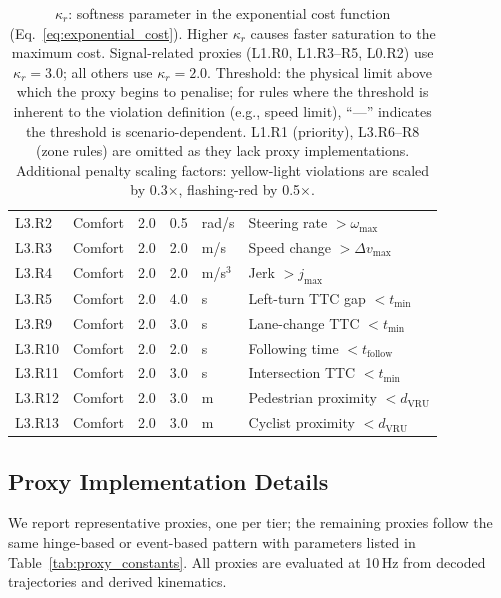 \begin{table}[t]
{\begin{tabular}{llccll}
L3.R2 & Comfort & 2.0 & 0.5 & rad/s & Steering rate $> \omega_{\max}$ \\
L3.R3 & Comfort & 2.0 & 2.0 & m/s & Speed change $> \Delta v_{\max}$ \\
L3.R4 & Comfort & 2.0 & 2.0 & m/s$^3$ & Jerk $> j_{\max}$ \\
L3.R5 & Comfort & 2.0 & 4.0 & s & Left-turn TTC gap $< t_{\min}$ \\
L3.R9 & Comfort & 2.0 & 3.0 & s & Lane-change TTC $< t_{\min}$ \\
L3.R10 & Comfort & 2.0 & 2.0 & s & Following time $< t_{\text{follow}}$ \\
L3.R11 & Comfort & 2.0 & 3.0 & s & Intersection TTC $< t_{\min}$ \\
L3.R12 & Comfort & 2.0 & 3.0 & m & Pedestrian proximity $< d_{\text{VRU}}$ \\
L3.R13 & Comfort & 2.0 & 3.0 & m & Cyclist proximity $< d_{\text{VRU}}$ \\
\bottomrule
\end{tabular}%
}
\vspace{1mm}
\caption*{\footnotesize $\kappa_r$: softness parameter in the exponential cost function (Eq.~\ref{eq:exponential_cost}).  Higher $\kappa_r$ causes faster saturation to the maximum cost.  Signal-related proxies (L1.R0, L1.R3--R5, L0.R2) use $\kappa_r{=}3.0$; all others use $\kappa_r{=}2.0$.  Threshold: the physical limit above which the proxy begins to penalise; for rules where the threshold is inherent to the violation definition (e.g., speed limit), ``---'' indicates the threshold is scenario-dependent.  L1.R1 (priority), L3.R6--R8 (zone rules) are omitted as they lack proxy implementations.  Additional penalty scaling factors: yellow-light violations are scaled by 0.3$\times$, flashing-red by 0.5$\times$.}
\end{table}
\subsection{Proxy Implementation Details}
\label{subsec:proxy_details}

We report representative proxies, one per tier; the remaining proxies follow the same hinge-based or event-based pattern with parameters listed in Table~\ref{tab:proxy_constants}. All proxies are evaluated at 10\,Hz from decoded trajectories and derived kinematics.

